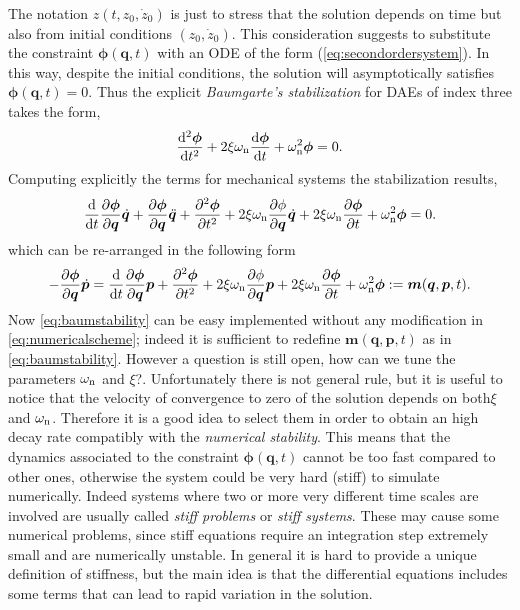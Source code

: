 		The notation $z(t,z_{0},\dot{z}_{0})$ is just to stress that the solution depends on time but also from initial conditions $(z_{0},\dot{z}_{0})$. This consideration suggests to substitute the constraint $\bm{\phi}(\bm{q},t)$ with an ODE of the form (\ref{eq:secondordersystem}). In this way, despite the initial conditions, the solution will asymptotically satisfies $\bm{\phi}(\bm{q},t)=0$. Thus the explicit \emph{Baumgarte's stabilization} for DAEs of index three takes the form,	
		\begin{equation*}
			\frac{\mathop{}\!\mathrm{d}^2\bm{\phi}}{\mathop{}\!\mathrm{d} t^2} + 2\xi\omega_{\textnormal{n}}\frac{\mathop{}\!\mathrm{d}\bm{\phi}}{\mathop{}\!\mathrm{d} t} + \omega_{\textnormal{n}}^2\bm{\phi} = 0.
		\end{equation*}
		Computing explicitly the terms for mechanical systems the stabilization results,
		\begin{equation}
			\frac{\mathop{}\!\mathrm{d}}{\mathop{}\!\mathrm{d} t}\frac{\partial\bm{\phi}}{\partial\bm{q}}\dot{\bm{q}}+\frac{\partial\bm{\phi}}{\partial\bm{q}}\ddot{\bm{q}}+\frac{\partial^{2}\bm{\phi}}{\partial t^2} + 2\xi\omega_{\textnormal{n}}\frac{\partial\phi}{\partial\bm{q}}\dot{\bm{q}} + 2\xi\omega_{\textnormal{n}}\frac{\partial\bm{\phi}}{\partial t}+\omega_{\textnormal{n}}^2\bm{\phi} = 0.
		\end{equation}
		which can be re-arranged in the following form
		\begin{equation}
			\label{eq:baumstability}
			-\frac{\partial\bm{\phi}}{\partial\bm{q}}\dot{\bm{p}} = \frac{\mathop{}\!\mathrm{d}}{\mathop{}\!\mathrm{d} t}\frac{\partial\bm{\phi}}{\partial\bm{q}}\bm{p}+\frac{\partial^{2}\bm{\phi}}{\partial t^2} + 2\xi\omega_{\textnormal{n}}\frac{\partial\phi}{\partial\bm{q}}\bm{p} + 2\xi\omega_{\textnormal{n}}\frac{\partial\bm{\phi}}{\partial t}+\omega_{\textnormal{n}}^2\bm{\phi} :=\bm{m}(\bm{q},\bm{p},t).
		\end{equation}
		Now \cref{eq:baumstability} can be easy implemented without any modification in \cref{eq:numericalscheme}; indeed it is sufficient to redefine $\bm{m}(\bm{q},\bm{p},t)$ as in \cref{eq:baumstability}. However a question is still open, how can we tune the parameters $\omega_{\textnormal{n}}$ and $\xi$?. Unfortunately there is not general rule, but it is useful to notice that the velocity of convergence to zero of the solution depends on both$\xi$ and $\omega_{\textnormal{n}}$. Therefore it is a good idea to select them in order to obtain an high decay rate compatibly with the \emph{numerical stability}. This means that the dynamics associated to the constraint $\bm{\phi}(\bm{q},t)$ cannot be too fast compared to other ones, otherwise the system could be very hard (stiff) to simulate numerically. Indeed systems where two or more very different time scales are involved are usually called \emph{stiff problems} or \emph{stiff systems}. These may cause some numerical problems, since stiff equations require an integration step extremely small and are numerically unstable. In general it is hard to provide a unique definition of stiffness, but the main idea is that the differential equations includes some terms that can lead to rapid variation in the solution.
